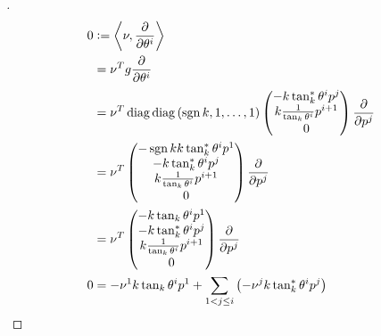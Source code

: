 \documentclass[../main.tex]{subfiles}
\begin{document}
\begin{proof}[]
    \begin{align*}
        0
         & \defeq \inner{\nu}{\frac{\partial}{\partial \tensor{\theta}{^i}}}     \\
         & = \nu^T g \frac{\partial}{\partial \tensor{\theta}{^i}}          \\
         & = \nu^T \diag\diag{\left(\sign{k},1,\dots,1\right)}
        \begin{pmatrix}
            -k\tan_k^\ast\tensor{\theta}{^i}\tensor{p}{^j}         \\
            k\frac{1}{\tan_k\tensor{\theta}{^i}}\tensor{p}{^{i+1}} \\
            0                                                      \\
        \end{pmatrix}
        \frac{\partial}{\partial \tensor{p}{^j}}                            \\
         & = \nu^T
        \begin{pmatrix}
            -\sign{k}k\tan_k^\ast\tensor{\theta}{^i}\tensor{p}{^1}           \\
            -k\tan_k^\ast\tensor{\theta}{^i}\tensor{p}{^j}           \\
            k\frac{1}{\tan_k\tensor{\theta}{^i}}\tensor{p}{^{i+1}} \\
            0                                                                                              \\
        \end{pmatrix}
        \frac{\partial}{\partial \tensor{p}{^j}}                            \\
        & = \nu^T
        \begin{pmatrix}
            -k\tan_k\tensor{\theta}{^i}\tensor{p}{^1}           \\
            -k\tan_k^\ast\tensor{\theta}{^i}\tensor{p}{^j}           \\
           k\frac{1}{\tan_k\tensor{\theta}{^i}}\tensor{p}{^{i+1}} \\
           0                                                                                              \\
       \end{pmatrix}
       \frac{\partial}{\partial \tensor{p}{^j}}                            \\
        0
         & =
        -\tensor{\nu}{^1}k\tan_k\tensor{\theta}{^i}\tensor{p}{^1}
        +\sum_{1<j\le i}{\left(-\tensor{\nu}{^j}k\tan_k^\ast\tensor{\theta}{^i}\tensor{p}{^j}\right)}

\end{align*}
\end{proof}
\end{document}
